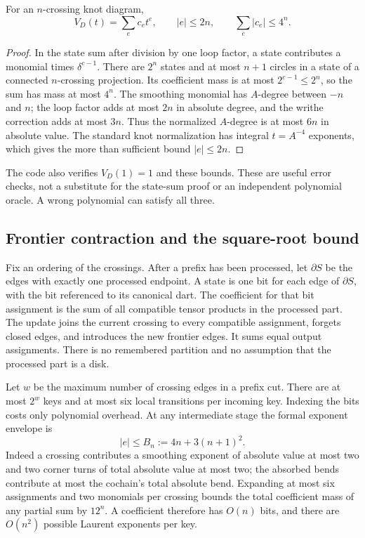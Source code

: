 \begin{proposition}
For an $n$-crossing knot diagram,
\[
 V_D(t)=\sum_e c_e t^e,\qquad |e|\leq2n,
 \qquad\sum_e|c_e|\leq4^n.
 \label{prop:jones-bounds}
\]
\end{proposition}
\begin{proof}
In the state sum after division by one loop factor, a state contributes a
monomial times $\delta^{c-1}$. There are $2^n$ states and at most $n+1$
circles in a state of a connected $n$-crossing projection. Its coefficient
mass is at most $2^{c-1}\leq2^n$, so the sum has mass at most $4^n$.
The smoothing monomial has $A$-degree between $-n$ and $n$; the loop factor
adds at most $2n$ in absolute degree, and the writhe correction adds at most
$3n$. Thus the normalized $A$-degree is at most $6n$ in absolute value.
The standard knot normalization has integral $t=A^{-4}$ exponents, which
gives the more than sufficient bound $|e|\leq2n$.
\end{proof}

The code also verifies $V_D(1)=1$ and these bounds. These are useful error
checks, not a substitute for the state-sum proof or an independent polynomial
oracle. A wrong polynomial can satisfy all three.

\subsection{Frontier contraction and the square-root bound}

Fix an ordering of the crossings. After a prefix has been processed, let
$\partial S$ be the edges with exactly one processed endpoint. A state is
one bit for each edge of $\partial S$, with the bit referenced to its
canonical dart. The coefficient for that bit assignment is the sum of all
compatible tensor products in the processed part. The update joins the
current crossing to every compatible assignment, forgets closed edges,
and introduces the new frontier edges. It sums equal output assignments.
There is no remembered partition and no assumption that the processed part
is a disk.

Let $w$ be the maximum number of crossing edges in a prefix cut. There are
at most $2^w$ keys and at most six local transitions per incoming key.
Indexing the bits costs only polynomial overhead. At any intermediate stage
the formal exponent envelope is
\begin{equation}
 |e|\leq B_n:=4n+3(n+1)^2.
 \label{eq:tensor-exponents}
\end{equation}
Indeed a crossing contributes a smoothing exponent of absolute value at most
two and two corner turns of total absolute value at most two; the absorbed
bends contribute at most the cochain's total absolute bend. Expanding at
most six assignments and two monomials per crossing bounds the total
coefficient mass of any partial sum by $12^n$. A coefficient therefore has
$O(n)$ bits, and there are $O(n^2)$ possible Laurent exponents per key.

